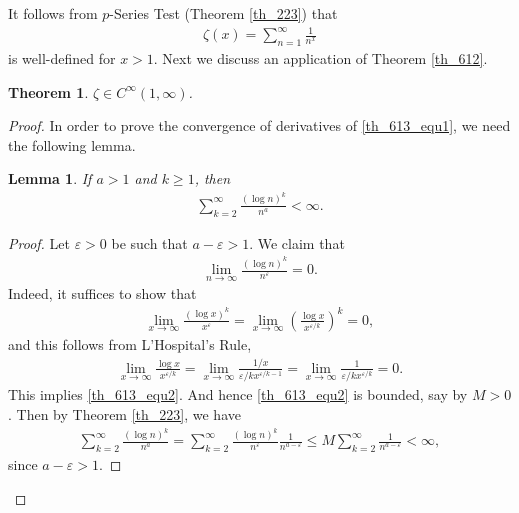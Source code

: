 \documentclass[10pt]{book}
\newtheorem{theorem}{Theorem}[chapter]
\newtheorem{lemma}{Lemma}[chapter]
\theoremstyle{definition}
\numberwithin{equation}{chapter}
\begin{document}
\medskip

It follows from $p$-Series Test (Theorem \ref{th_223}) that 
\begin{align}\label{th_613_equ1}
    \zeta(x) = \sum^\infty_{n=1} \frac{1}{n^x}
\end{align}
is well-defined for $x > 1$. Next we discuss an application of Theorem \ref{th_612}.

\medskip

\begin{theorem}
$\zeta \in C^\infty(1,\infty)$.
\end{theorem}
\begin{proof}
In order to prove the convergence of derivatives of \eqref{th_613_equ1}, we need the following lemma.

\medskip

\begin{lemma}\label{lemma_61}
If $a > 1$ and $k \geq 1$, then
\begin{align*}
    \sum^\infty_{k=2} \frac{(\log n)^k}{n^a} < \infty.
\end{align*}
\end{lemma}
\begin{proof}
Let $\varepsilon > 0$ be such that $a - \varepsilon > 1$. We claim that
\begin{align}\label{th_613_equ2}
    \lim_{n\to\infty} \frac{(\log n)^k}{n^\varepsilon} = 0.
\end{align}
Indeed, it suffices to show that
\begin{align*}
    \lim_{x\to\infty} \frac{(\log x)^k}{x^\varepsilon} = \lim_{x\to\infty} \left(\frac{\log x}{x^{\varepsilon/k}} \right)^k = 0,
\end{align*}
and this follows from L'Hospital's Rule, 
\begin{align*}
    \lim_{x\to\infty} \frac{\log x}{x^{\varepsilon/k}} = \lim_{x\to\infty} \frac{1/x}{\varepsilon/k x^{\varepsilon/k - 1}} = \lim_{x\to\infty} \frac{1}{\varepsilon/k x^{\varepsilon/k}} = 0.
\end{align*}
This implies \eqref{th_613_equ2}. And hence \eqref{th_613_equ2} is bounded, say by $M > 0$. Then by Theorem \ref{th_223}, we have
\begin{align*}
    \sum^\infty_{k=2} \frac{(\log n)^k}{n^a} = \sum^\infty_{k=2} \frac{(\log n)^k}{n^\varepsilon} \frac{1}{n^{a - \varepsilon}} \leq M \sum^\infty_{k=2} \frac{1}{n^{a - \varepsilon}} < \infty,
\end{align*}
since $a - \varepsilon > 1$.
\end{proof}


\end{proof}
\end{document}
